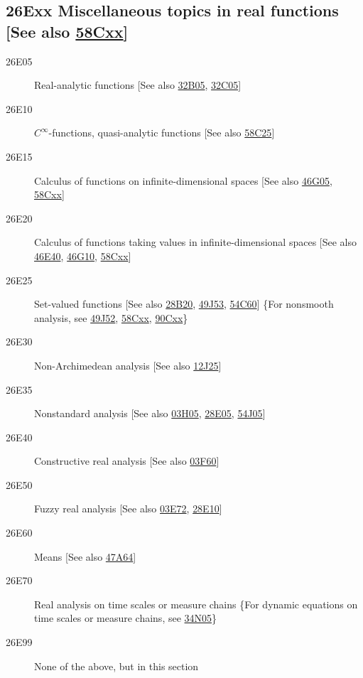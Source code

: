 \documentclass[letterpaper]{article}
\begin{document}
\subsection*{26Exx  Miscellaneous topics in real functions [See also \hyperref[58Cxx]{58Cxx}] }\label{26Exx}
\begin{description}
\item [26E05]\label{26E05} Real-analytic functions [See also \hyperref[32B05]{32B05}, \hyperref[32C05]{32C05}]
\item [26E10]\label{26E10} $C^\infty$-functions, quasi-analytic functions [See also \hyperref[58C25]{58C25}]
\item [26E15]\label{26E15} Calculus of functions on infinite-dimensional spaces [See also \hyperref[46G05]{46G05}, \hyperref[58Cxx]{58Cxx}]
\item [26E20]\label{26E20} Calculus of functions taking values in infinite-dimensional spaces [See also \hyperref[46E40]{46E40}, \hyperref[46G10]{46G10}, \hyperref[58Cxx]{58Cxx}]
\item [26E25]\label{26E25} Set-valued functions [See also \hyperref[28B20]{28B20}, \hyperref[49J53]{49J53}, \hyperref[54C60]{54C60}] \{For nonsmooth analysis, see \hyperref[49J52]{49J52}, \hyperref[58Cxx]{58Cxx}, \hyperref[90Cxx]{90Cxx}\}
\item [26E30]\label{26E30} Non-Archimedean analysis [See also \hyperref[12J25]{12J25}]
\item [26E35]\label{26E35} Nonstandard analysis [See also \hyperref[03H05]{03H05}, \hyperref[28E05]{28E05}, \hyperref[54J05]{54J05}]
\item [26E40]\label{26E40} Constructive real analysis [See also \hyperref[03F60]{03F60}]
\item [26E50]\label{26E50} Fuzzy real analysis [See also \hyperref[03E72]{03E72}, \hyperref[28E10]{28E10}]
\item [26E60]\label{26E60} Means [See also \hyperref[47A64]{47A64}]
\item [26E70]\label{26E70} Real analysis on time scales or measure chains \{For dynamic equations on time scales or measure chains, see \hyperref[34N05]{34N05}\}
\item [26E99]\label{26E99} None of the above, but in this section
\end{description}
\end{document}
